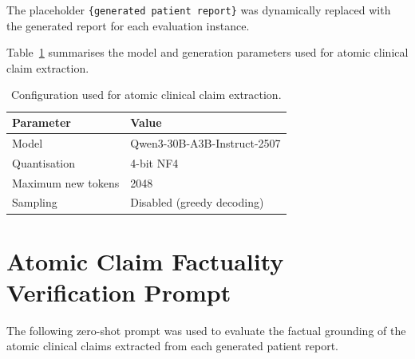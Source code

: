 \documentclass[ %
                    author={Aman Kumar Singh},
                supervisor={Dr. Edwin Simpson},
                    degree={MSc},
                     title={Quality-Aware Knowledge Distillation of Large Language Models for Efficient Personalised Clinical Report Generation},
                  subtitle={},
                      type={},
                      year={2021}]{dissertation}
\begin{document}
The placeholder \texttt{\{generated patient report\}} was dynamically
replaced with the generated report for each evaluation instance.

Table~\ref{tab:factuality_claim_config} summarises the model and generation parameters used for atomic clinical claim extraction.

\begin{table}[htbp]
\centering
\caption{Configuration used for atomic clinical claim extraction.}
\label{tab:factuality_claim_config}
\begin{tabular}{ll}
\hline
\textbf{Parameter} & \textbf{Value} \\
\hline
Model & Qwen3-30B-A3B-Instruct-2507 \\
Quantisation & 4-bit NF4 \\
Maximum new tokens & 2048 \\
Sampling & Disabled (greedy decoding) \\

\hline
\end{tabular}
\end{table}

\chapter{Atomic Claim Factuality Verification Prompt}
\label{appx:factuality_verification_prompt}

The following zero-shot prompt was used to evaluate the factual
grounding of the atomic clinical claims extracted from each generated
patient report.
\end{document}
